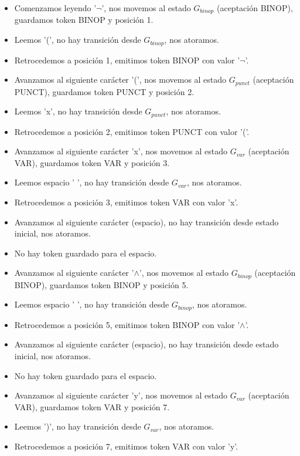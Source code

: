 \begin{enumerate}
    \begin{itemize}
        \item Comenzamos leyendo '$\lnot$', nos movemos al estado $G_{binop}$ (aceptación BINOP), guardamos token BINOP y posición 1.
        \item Leemos '(', no hay transición desde $G_{binop}$, nos atoramos.
        \item Retrocedemos a posición 1, emitimos token BINOP con valor '$\lnot$'.
        \item Avanzamos al siguiente carácter '(', nos movemos al estado $G_{punct}$ (aceptación PUNCT), guardamos token PUNCT y posición 2.
        \item Leemos 'x', no hay transición desde $G_{punct}$, nos atoramos.
        \item Retrocedemos a posición 2, emitimos token PUNCT con valor '('.
        \item Avanzamos al siguiente carácter 'x', nos movemos al estado $G_{var}$ (aceptación VAR), guardamos token VAR y posición 3.
        \item Leemos espacio ' ', no hay transición desde $G_{var}$, nos atoramos.
        \item Retrocedemos a posición 3, emitimos token VAR con valor 'x'.
        \item Avanzamos al siguiente carácter (espacio), no hay transición desde estado inicial, nos atoramos.
        \item No hay token guardado para el espacio.
        \item Avanzamos al siguiente carácter '$\land$', nos movemos al estado $G_{binop}$ (aceptación BINOP), guardamos token BINOP y posición 5.
        \item Leemos espacio ' ', no hay transición desde $G_{binop}$, nos atoramos.
        \item Retrocedemos a posición 5, emitimos token BINOP con valor '$\land$'.
        \item Avanzamos al siguiente carácter (espacio), no hay transición desde estado inicial, nos atoramos.
        \item No hay token guardado para el espacio.
        \item Avanzamos al siguiente carácter 'y', nos movemos al estado $G_{var}$ (aceptación VAR), guardamos token VAR y posición 7.
        \item Leemos ')', no hay transición desde $G_{var}$, nos atoramos.
        \item Retrocedemos a posición 7, emitimos token VAR con valor 'y'.

\end{itemize}
\end{enumerate}
